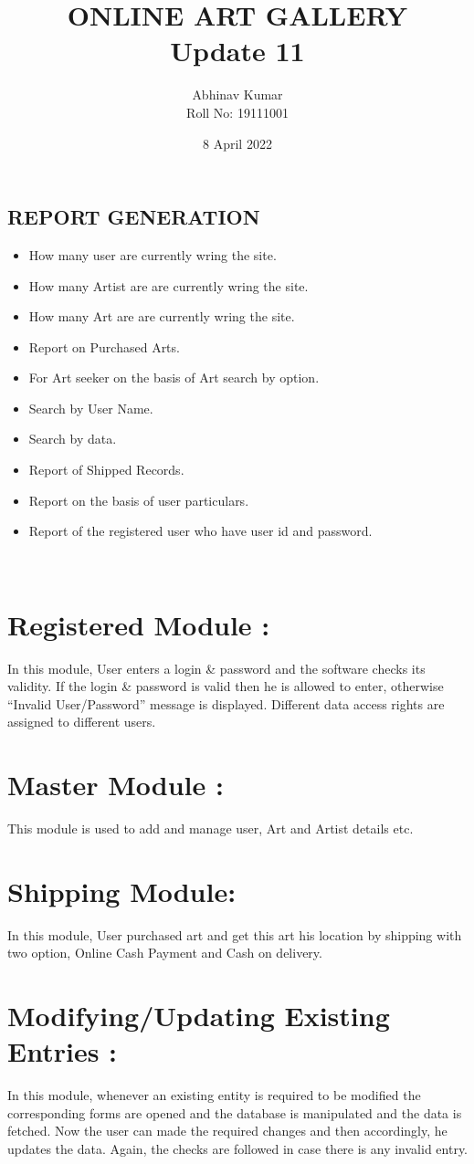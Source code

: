 \documentclass{article}
\title{ONLINE ART GALLERY \\ Update 11}
\date{8 April 2022}
\author{Abhinav Kumar \\ Roll No: 19111001 }
\begin{document}
\maketitle
\begin{center}
   \section*{\textbf{REPORT GENERATION}}
\end{center}
\begin{itemize}
    \item How many user are currently wring the site.
\item How many Artist are are currently wring the site.
\item How many Art are are currently wring the site.
\item Report on Purchased Arts.
\item For Art seeker on the basis of Art search by option.
\item Search by User Name.
\item Search by data.
\item Report of Shipped Records.
\item Report on the basis of user particulars.
\item Report of the registered user who have user id and password.
\end{itemize}
\\
\section*{Registered Module : }In this module, User enters a login & password and the software checks its validity. If the login & password is valid then he is allowed to enter, otherwise “Invalid User/Password” message is displayed. Different data access rights are assigned to different users.
\section*{ Master Module : } This module is used to add and manage user, Art and Artist details etc.
\section*{ Shipping Module: }In this module, User purchased art and get this art his location by shipping with two option, Online Cash Payment and Cash on delivery.
\section*{Modifying/Updating Existing Entries : }In this module, whenever an existing entity is required to be modified the corresponding forms are opened and the database is manipulated and the data is fetched. Now the user can made the required changes and then accordingly, he updates the data. Again, the checks are followed in case there is any invalid entry.
\end{document}
